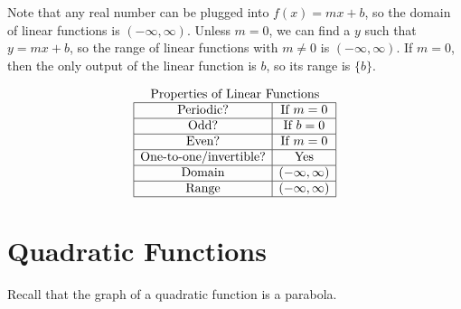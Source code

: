 \documentclass[nooutcomes]{ximera}
\begin{document}
Note that any real number can be plugged into $f(x) = mx + b$, so the domain of linear functions is $(-\infty, \infty)$. Unless $m = 0$, we can find a $y$ such that $y = mx + b$, so the range of linear functions with $m \ne 0$ is $(-\infty, \infty)$. If $m = 0$, then the only output of the linear function is $b$, so its range is $\{b\}$. 

\[
\begin{array}{  c  }
\text{\normalfont Properties of Linear Functions} \\
 \begin{array}{|c|c|}
 \hline
\text{Periodic?} & \text{If } m = 0 \\ \hline
\text{Odd?} & \text{If } b = 0 \\ \hline
\text{Even?} & \text{If } m = 0 \\ \hline
\text{One-to-one/invertible?} & \text{Yes}\\ \hline
\text{Domain} & (-\infty,\infty)\\ \hline
\text{Range} & (-\infty,\infty)\\ \hline
\end{array}
\end{array}
\]

\newpage


\section{Quadratic Functions}

Recall that the graph of a quadratic function is a parabola.
\end{document}
